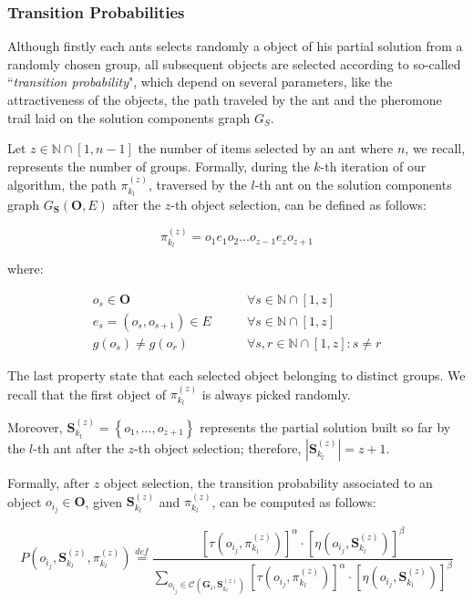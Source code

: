 \documentclass[12pt,a4paper]{report}
\newcommand{\mathDef}{\overset{\textit{def}}{=}}
\newcommand{\N}{\mathbb{N}}
\newcommand{\SetFromOneTo}[1]{\N \cap \left[1,#1\right]}
\newcommand{\ItalicQuotMark}[1]{``\textit{#1}"}
\theoremstyle{definition}
\begin{document}
\newpage

\subsubsection{Transition Probabilities}

Although firstly each ants selects randomly a object of his partial solution from a randomly chosen group, all subsequent objects are selected according to so-called \ItalicQuotMark{transition probability}, which depend on several parameters, like the 
attractiveness of the objects, the path traveled by the ant and the pheromone trail laid on the solution components graph $G_{S\textbf{}}$.

Let $z \in \SetFromOneTo{n-1}$ the number of items selected by an ant where $n$, we recall, represents the number of groups. Formally, during the $k$-th iteration of our algorithm, the path $\pi_{k_l}^{(z)}$, traversed by the $l$-th ant on the solution components graph $G_{\textbf{S}}(\textbf{O},E)$ after the $z$-th object selection, can be defined as follows:

\begin{equation}
	\pi_{k_l}^{(z)} = o_1e_1o_2 \ldots o_{z-1}e_{z}o_{z+1}
\end{equation} 

where:

\begin{eqnarray}
	o_s \in \textbf{O} & \qquad \forall s \in \SetFromOneTo{z} \\
	e_s = (o_s,o_{s+1}) \in E  & \qquad \forall s \in \SetFromOneTo{z} \\
	g(o_s) \neq g(o_r)   &\qquad \forall s,r \in \SetFromOneTo{z} : s \neq r
\end{eqnarray}

The last property state that each selected object belonging to distinct groups. We recall that the first object of $\pi_{k_l}^{(z)}$ is always picked randomly.

Moreover, $\textbf{S}_{k_l}^{(z)} = \left\{o_1,\ldots,o_{z+1}\right\}$ represents the partial solution built so far by the $l$-th ant after the $z$-th object selection; therefore, $|\textbf{S}_{k_l}^{(z)}| = z + 1$.  

Formally, after $z$ object selection, the transition probability associated to an object $o_{i_j} \in \textbf{O}$, given $\textbf{S}_{k_l}^{(z)}$ and $\pi_{k_l}^{(z)}$, can be computed as follows:

\begin{equation}
	P(o_{i_j}, \textbf{S}_{k_l}^{(z)}, \pi_{k_l}^{(z)}) \mathDef \frac{\left[ \tau( o_{i_j}, \pi_{k_l}^{(z)}) \right]^{\alpha} \cdot \left[ \eta( o_{i_j}, \textbf{S}_{k_l}^{(z)}) \right]^{\beta}}{\displaystyle \sum_{o_{i_j} \in \mathcal{C}(\textbf{G}_i, \textbf{S}_{k_l}^{(z)})} \left[ \tau( o_{i_j}, \pi_{k_l}^{(z)}) \right]^{\alpha} \cdot \left[ \eta( o_{i_j}, \textbf{S}_{k_l}^{(z)}) \right]^{\beta}}
\end{equation}
\end{document}
